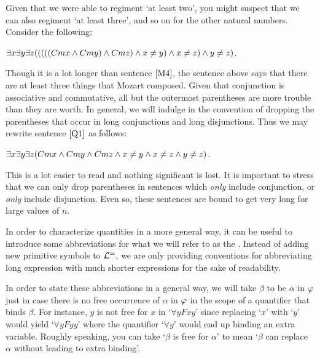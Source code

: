 Given that we were able to regiment `at least two', you might suspect that we can also regiment `at least three', and so on for the other natural numbers.
Consider the following:

\begin{earg}
  \item[\ex{Q1}] $\exists x\exists y\exists z(((((Cmx \wedge Cmy) \wedge Cmz) \wedge x\neq y) \wedge x\neq z) \wedge y\neq z)$.
\end{earg}

Though it is a lot longer than sentence $\ref{M4}$, the sentence above says that there are at least three things that Mozart composed.
Given that conjunction is associative and commutative, all but the outermost parentheses are more trouble than they are worth.
In general, we will indulge in the convention of dropping the parentheses that occur in long conjunctions and long disjunctions.
Thus we may rewrite sentence $\ref{Q1}$ as follows:

\begin{earg}
  \item[\ex{Q2}] $\exists x\exists y\exists z(Cmx \wedge Cmy \wedge Cmz \wedge x\neq y \wedge x\neq z \wedge y\neq z)$.
\end{earg}

This is a lot easier to read and nothing significant is lost.
It is important to stress that we can only drop parentheses in sentences which \textit{only} include conjunction, or \textit{only} include disjunction.
Even so, these sentences are bound to get very long for large values of $n$.

In order to characterize quantities in a more general way, it can be useful to introduce some abbreviations for what we will refer to as the .
Instead of adding new primitive symbols to $\mathcal{L}^{=}$, we are only providing conventions for abbreviating long expression with much shorter expressions for the sake of readability.

In order to state these abbreviations in a general way, we will take $\beta$ to be  $\alpha$ in $\varphi$ just in case there is no free occurrence of $\alpha$ in $\varphi$ in the scope of a quantifier that binds $\beta$. 
For instance, $y$ is not free for $x$ in `$\forall y Fxy$' since replacing `$x$' with `$y$' would yield `$\forall yFyy$' where the quantifier `$\forall y$' would end up binding an extra variable.
Roughly speaking, you can take `$\beta$ is free for $\alpha$' to mean `$\beta$ can replace $\alpha$ without leading to extra binding'.


